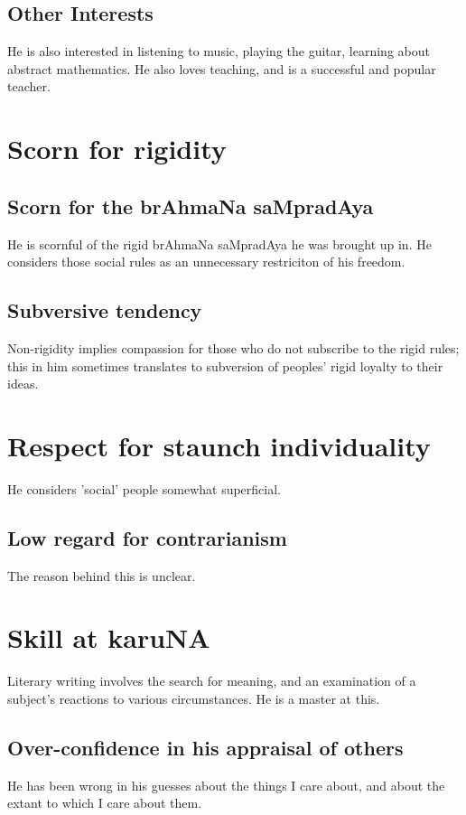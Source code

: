 \documentclass[oneside, article]{memoir}
\begin{document}
\subsection{Other Interests}
He is also interested in listening to music, playing the guitar, learning about abstract mathematics. He also loves teaching, and is a successful and popular teacher.

\section{Scorn for rigidity}
\subsection{Scorn for the brAhmaNa saMpradAya}
He is scornful of the rigid brAhmaNa saMpradAya he was brought up in. He considers those social rules as an unnecessary restriciton of his freedom.
\tbc

\subsection{Subversive tendency}
Non-rigidity implies compassion for those who do not subscribe to the rigid rules; this in him sometimes translates to subversion of peoples' rigid loyalty to their ideas.

\section{Respect for staunch individuality}
He considers 'social' people somewhat superficial.

\subsection{Low regard for contrarianism}
The reason behind this is unclear.

\section{Skill at karuNA}
Literary writing involves the search for meaning, and an examination of a subject's reactions to various circumstances. He is a master at this.

\subsection{Over-confidence in his appraisal of others}
He has been wrong in his guesses about the things I care about, and about the extant to which I care about them.
\end{document}
